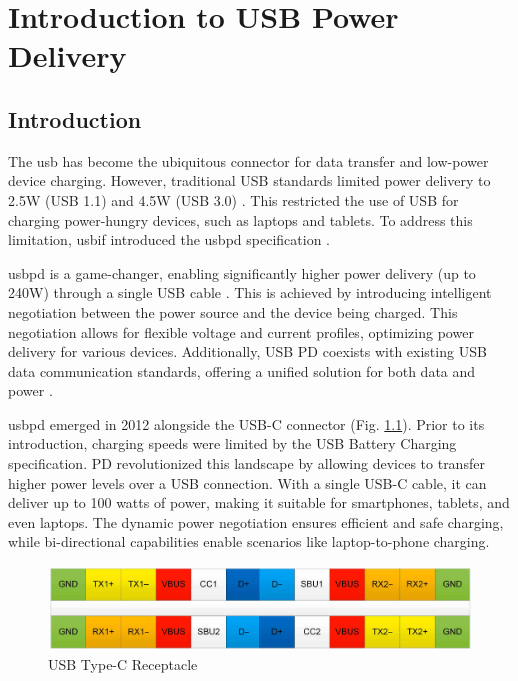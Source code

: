 \chapter{Introduction to USB Power Delivery}

\section[Introduction]{\textbf{Introduction}}
The \gls{usb} has become the ubiquitous connector for data transfer and low-power device charging. However, traditional USB standards limited power delivery to 2.5W (USB 1.1) and 4.5W (USB 3.0) \cite{renesas_usb_pd}. This restricted the use of USB for charging power-hungry devices, such as laptops and tablets. To address this limitation, \gls{usbif} introduced the \gls{usbpd} specification \cite{usb_if_usb_charger}.

\gls{usbpd} is a game-changer, enabling significantly higher power delivery (up to 240W) through a single USB cable \cite{usb_if_usb_charger}. This is achieved by introducing intelligent negotiation between the power source and the device being charged. This negotiation allows for flexible voltage and current profiles, optimizing power delivery for various devices. Additionally, USB PD coexists with existing USB data communication standards, offering a unified solution for both data and power \cite{renesas_usb_pd}.

\gls{usbpd} emerged in 2012 alongside the USB-C connector (Fig. \ref{fig:typec_recep}). Prior to its introduction, charging speeds were limited by the USB Battery Charging specification. PD revolutionized this landscape by allowing devices to transfer higher power levels over a USB connection. With a single USB-C cable, it can deliver up to 100 watts of power, making it suitable for smartphones, tablets, and even laptops. The dynamic power negotiation ensures efficient and safe charging, while bi-directional capabilities enable scenarios like laptop-to-phone charging. 
\begin{figure}[htb]
\centering
	\includegraphics[scale=0.4]{Chapter1/Figures/typec_recep.png}	
	\caption{USB Type-C Receptacle }
	\label{fig:typec_recep}
\end{figure}

